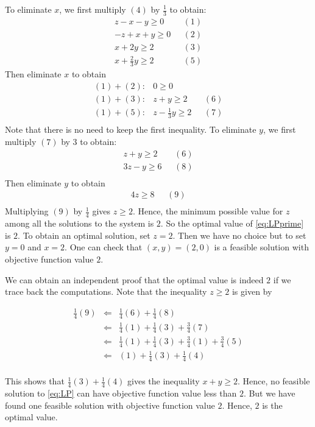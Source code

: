 To eliminate \(x\), we first multiply \((4)\) by \(\frac{1}{3}\) to
obtain: \[
\begin{array}{rl}
 z - x - y \geq 0 & ~~~(1) \\
-z + x + y \geq 0 & ~~~(2) \\
 x + 2y  \geq 2 &~~~(3)\\
 x + \frac{2}{3}y  \geq 2 & ~~~(5)
\end{array}
\] Then eliminate \(x\) to obtain \[
\begin{array}{rrl}
(1) + (2):  & 0 \geq 0 \\
(1) + (3):  & z + y \geq 2 & ~~~(6) \\
(1) + (5):  & z - \frac{1}{3} y \geq 2 & ~~~(7) \\
\end{array}
\] Note that there is no need to keep the first inequality. To eliminate
\(y\), we first multiply \((7)\) by \(3\) to obtain: \[
\begin{array}{rl}
  z + y \geq 2 & ~~~(6) \\
  3z - y \geq 6 & ~~~(8) \\
\end{array}
\] Then eliminate \(y\) to obtain \[
\begin{array}{rl}
  4z \geq 8 & ~~~(9) \\
\end{array}
\] Multiplying \((9)\) by \(\frac{1}{4}\) gives \(z \geq 2\). Hence, the
minimum possible value for \(z\) among all the solutions to the system
is \(2\). So the optimal value of \eqref{eq:LPprime} is \(2\). To obtain
an optimal solution, set \(z = 2\). Then we have no choice but to set
\(y = 0\) and \(x = 2\). One can check that \((x,y) = (2,0)\) is a
feasible solution with objective function value \(2\).

We can obtain an independent proof that the optimal value is indeed
\(2\) if we trace back the computations. Note that the inequality
\(z \geq 2\) is given by

\begin{eqnarray*}
\frac{1}{4} (9) 
& \Leftarrow & \frac{1}{4} (6) + \frac{1}{4} (8) \\
& \Leftarrow & \frac{1}{4} (1)+\frac{1}{4}(3) + \frac{3}{4}(7) \\
& \Leftarrow & \frac{1}{4} (1)+\frac{1}{4}(3) + \frac{3}{4}(1)+\frac{3}{4}(5) \\
& \Leftarrow & (1)+ \frac{1}{4}(3) + \frac{1}{4} (4)  \\
\end{eqnarray*}

This shows that \(\frac{1}{4}(3) + \frac{1}{4} (4)\) gives the
inequality \(x+y \geq 2\). Hence, no feasible solution to \eqref{eq:LP}
can have objective function value less than \(2\). But we have found one
feasible solution with objective function value \(2\). Hence, \(2\) is
the optimal value.



